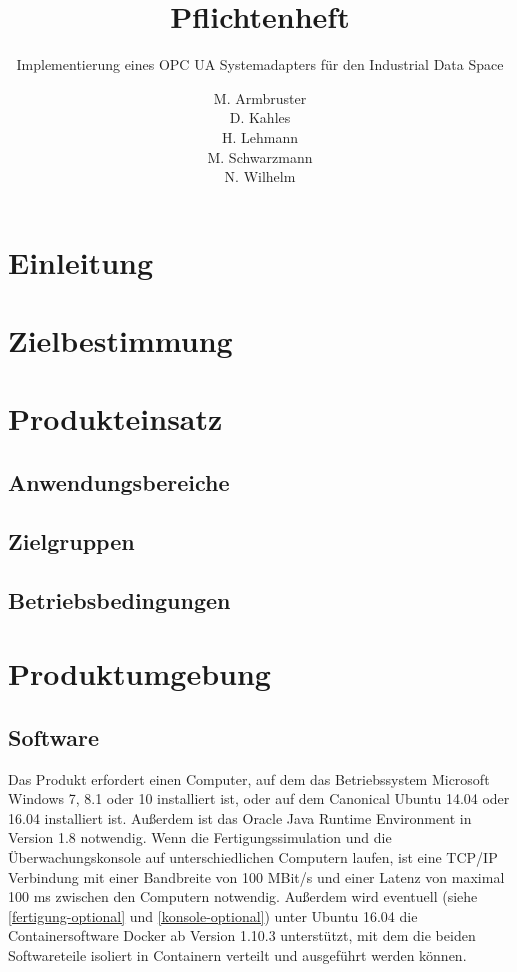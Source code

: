 \documentclass[parskip=full]{scrartcl}
\title{Pflichtenheft}
\subtitle{Implementierung eines OPC UA Systemadapters für den Industrial Data Space}
\author{
    M. Armbruster\\
    D. Kahles\\
    H. Lehmann\\
    M. Schwarzmann\\
    N. Wilhelm
}
\begin{document}
\maketitle
\tableofcontents
\pagebreak

\section{Einleitung}
\Blindtext[1]

\section{Zielbestimmung}
\Blindtext[1]

\section{Produkteinsatz}
\subsection{Anwendungsbereiche}
\Blindtext[1]

\subsection{Zielgruppen}
\Blindtext[1]

\subsection{Betriebsbedingungen}
\Blindtext[1]

\section{Produktumgebung}
\subsection{Software}
Das Produkt erfordert einen Computer, auf dem das Betriebssystem Microsoft Windows 7, 8.1 oder 10 installiert ist,
oder auf dem Canonical Ubuntu 14.04 oder 16.04 installiert ist. Außerdem ist das Oracle Java Runtime Environment in Version 1.8
notwendig. Wenn die Fertigungssimulation und die Überwachungskonsole auf unterschiedlichen Computern laufen,
ist eine TCP/IP Verbindung mit einer Bandbreite von 100 MBit/s und einer Latenz von maximal 100 ms zwischen den Computern notwendig.
Außerdem wird eventuell (siehe \ref{fertigung-optional} und \ref{konsole-optional}) unter Ubuntu 16.04 die Containersoftware Docker
ab Version 1.10.3 unterstützt, mit dem die beiden Softwareteile isoliert in Containern verteilt und ausgeführt werden können.
\end{document}
